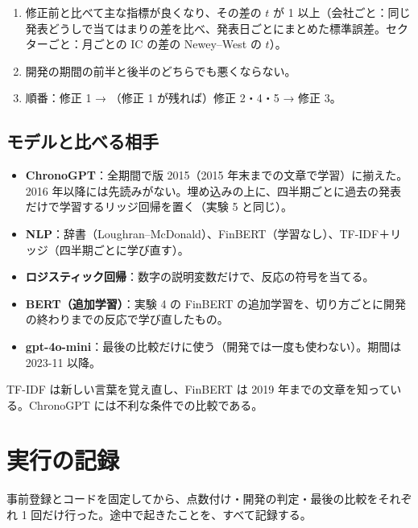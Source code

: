 \documentclass[xelatex,ja=standard,jafont=haranoaji,a4paper,10pt,openany]{bxjsreport}
\begin{document}
\begin{enumerate}
\item 修正前と比べて主な指標が良くなり、その差の $t$ が 1 以上（会社ごと：同じ発表どうしで当てはまりの差を比べ、発表日ごとにまとめた標準誤差。セクターごと：月ごとの IC の差の Newey--West の $t$）。
\item 開発の期間の前半と後半のどちらでも悪くならない。
\item 順番：修正 1 → （修正 1 が残れば）修正 2・4・5 → 修正 3。
\end{enumerate}

\section{モデルと比べる相手}

\begin{itemize}
\item \textbf{ChronoGPT}：全期間で版 2015（2015 年末までの文章で学習）に揃えた。2016 年以降には先読みがない。埋め込みの上に、四半期ごとに過去の発表だけで学習するリッジ回帰を置く（実験 5 と同じ）。
\item \textbf{NLP}：辞書（Loughran--McDonald）、FinBERT（学習なし）、TF-IDF＋リッジ（四半期ごとに学び直す）。
\item \textbf{ロジスティック回帰}：数字の説明変数だけで、反応の符号を当てる。
\item \textbf{BERT（追加学習）}：実験 4 の FinBERT の追加学習を、切り方ごとに開発の終わりまでの反応で学び直したもの。
\item \textbf{gpt-4o-mini}：最後の比較だけに使う（開発では一度も使わない）。期間は 2023-11 以降。
\end{itemize}

TF-IDF は新しい言葉を覚え直し、FinBERT は 2019 年までの文章を知っている。ChronoGPT には不利な条件での比較である。

\chapter{実行の記録}\label{ch:record}

事前登録とコードを固定してから、点数付け・開発の判定・最後の比較をそれぞれ 1 回だけ行った。途中で起きたことを、すべて記録する。
\end{document}

